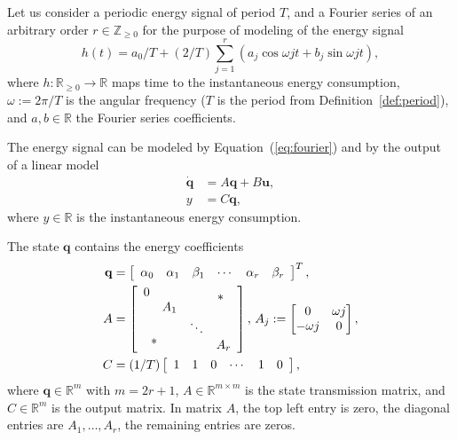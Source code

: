 \documentclass[letterpaper,10pt,conference]{ieeeconf}
\theoremstyle{definition}
\begin{document}
Let us consider a periodic energy signal of period $T$, and a Fourier series of an arbitrary order $r\in\mathbb{Z}_{\geq 0}$ for the purpose of modeling of the energy signal
\begin{equation}\label{eq:fourier}
  h(t)=a_0/T+(2/T)\sum_{j=1}^{r}{\left(a_j\cos{\omega jt}+b_j\sin{\omega jt}\right)},
\end{equation}
where $h:\mathbb{R}_{\geq 0}\rightarrow\mathbb{R}$ maps time to the instantaneous energy consumption, $\omega:=2\pi/T$ is the angular frequency ($T$ is the period from Definition~\ref{def:period}), and $a,b\in\mathbb{R}$ the Fourier series coefficients.

The energy signal can be modeled by Equation~(\ref{eq:fourier}) and by the output of a linear model
\begin{equation}\label{eq:state-perf}\begin{split}
  \dot{\mathbf{q}}&=A\mathbf{q}+B\mathbf{u},\\
  y&=C\mathbf{q},
\end{split}\end{equation}
where $y\in\mathbb{R}$ is the instantaneous energy consumption. 

The state $\mathbf{q}$ contains the energy coefficients
\begin{equation}\label{eq:state-details}\begin{split}
  \mathbf{q}&=\left[\begin{array}{cccccc}
    \alpha_0 & \alpha_1 & \beta_1 & \cdots & \alpha_r & \beta_r
  \end{array}\right]^T,\\
  A&=\left[\begin{array}{cccc}
    0&                     &       & \makebox(-5,-5){*}  \\
     & A_1                 &       &  \\
     & \makebox(-25,-15){*}& \ddots&  \\
     &                     &       & A_r 
  \end{array}\right],\,A_j:=\begin{bmatrix}0 & \omega j \\ -\omega j & 0\end{bmatrix},\\
  C&=(1/T)\left[\begin{array}{cccccc}
    1 & 1 & 0 &\cdots & 1 & 0
  \end{array}\right],
\end{split}\end{equation}
where $\mathbf{q}\in\mathbb{R}^m$ with $m=2r+1$, $A\in\mathbb{R}^{m\times m}$ is the state transmission matrix, and $C\in\mathbb{R}^m$ is the output matrix. In matrix $A$, the top left entry is zero, the diagonal entries are $A_1,\dots,A_r$, the remaining entries are zeros.
\end{document}
